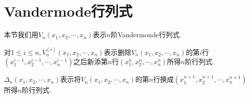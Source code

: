\documentclass[../../main.tex]{subfiles}%
\begin{document}
\section{Vandermode行列式}

本节我们用\(V_n(x_1,x_2,\cdots,x_n)\)表示\(n\)阶Vandermonde行列式.
\begin{definition}
对\(1\leqslant i\leqslant n,V_n^{(i)}(x_1,x_2,\cdots,x_n)\)表示删除\(V_n(x_1,x_2,\cdots,x_n)\)的第\(i\)行\((x_1^{i - 1},x_2^{i - 1},\cdots,x_n^{i - 1})\)之后新添第\(n\)行\((x_1^{n},x_2^{n},\cdots,x_n^{n})\)所得\(n\)阶行列式.
\end{definition}

\begin{definition}
\(\Delta_n(x_1,x_2,\cdots,x_n)\)表示将\(V_n(x_1,x_2,\cdots,x_n)\)的第\(n\)行换成\((x_1^{n + 1},x_2^{n + 1},\cdots,x_n^{n + 1})\)所得\(n\)阶行列式.
\end{definition}
\end{document}
